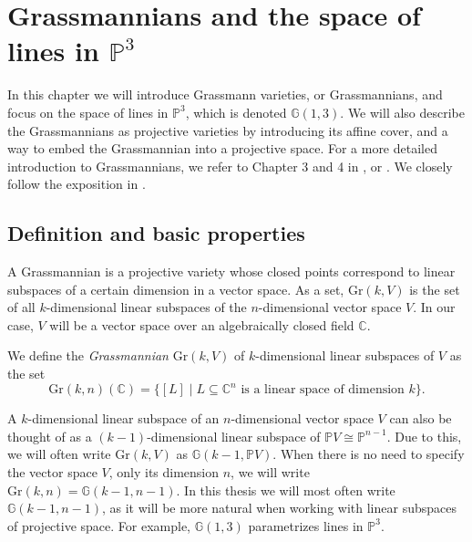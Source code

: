 \chapter{Grassmannians and the space of lines in \texorpdfstring{$\mathbb{P}^3$}{P3}}\label{grassmannians}

In this chapter we will introduce Grassmann varieties, or Grassmannians, and focus on the space of lines in $\mathbb{P}^3$, which is denoted $\mathbb{G}(1, 3)$. We will also describe the Grassmannians as projective varieties by introducing its affine cover, and a way to embed the Grassmannian into a projective space. For a more detailed introduction to Grassmannians, we refer to Chapter 3 and 4 in \cite{EH16}, or \cite[Section A.8]{EO25}. We closely follow the exposition in \cite{EO25}.


\section{Definition and basic properties}

A Grassmannian is a projective variety whose closed points correspond to linear subspaces of a certain dimension in a vector space. As a set, $\mathrm{Gr}(k, V)$ is the set of all $k$-dimensional linear subspaces of the $n$-dimensional vector space $V$. In our case, $V$ will be a vector space over an algebraically closed field $\mathbb{C}$.

\begin{definition}
    We define the \emph{Grassmannian} $\mathrm{Gr}(k, V)$ of $k$-dimensional linear subspaces of $V$ as the set
    \[\mathrm{Gr}(k,n)(\mathbb{C}) = \{[L] \mid L \subseteq \mathbb{C}^n \text{ is a linear space of dimension } k\}.\] 
\end{definition}

A $k$-dimensional linear subspace of an $n$-dimensional vector space $V$ can also be thought of as a $(k - 1)$-dimensional linear subspace of $\mathbb{P}V \cong \mathbb{P}^{n-1}$. Due to this, we will often write $\mathrm{Gr}(k, V)$ as $\mathbb{G}(k-1, \mathbb{P}V)$. When there is no need to specify the vector space $V$, only its dimension $n$, we will write $\mathrm{Gr}(k,n) = \mathbb{G}(k-1, n-1)$. In this thesis we will most often write $\mathbb{G}(k-1,n-1)$, as it will be more natural when working with linear subspaces of projective space. For example, $\mathbb{G}(1,3)$ parametrizes lines in $\mathbb{P}^3$. 

